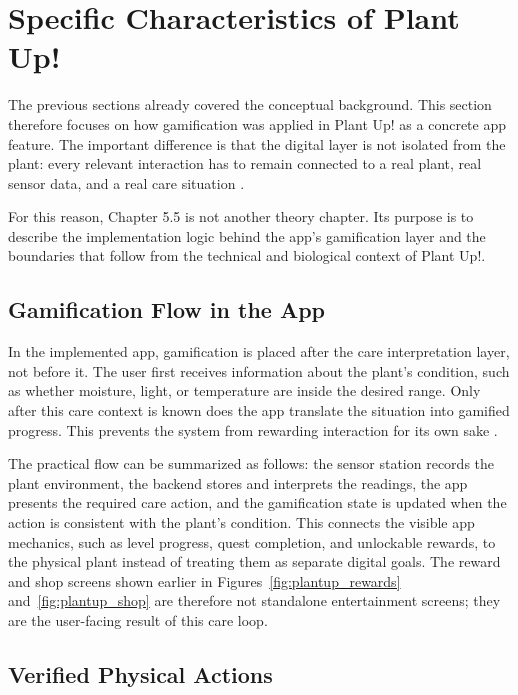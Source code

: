 \section{Specific Characteristics of Plant Up!}

The previous sections already covered the conceptual background. This section therefore focuses on how gamification was applied in Plant Up! as a concrete app feature. The important difference is that the digital layer is not isolated from the plant: every relevant interaction has to remain connected to a real plant, real sensor data, and a real care situation \cite{plantUpProject}.

For this reason, Chapter 5.5 is not another theory chapter. Its purpose is to describe the implementation logic behind the app's gamification layer and the boundaries that follow from the technical and biological context of Plant Up!.

\subsection{Gamification Flow in the App}

In the implemented app, gamification is placed after the care interpretation layer, not before it. The user first receives information about the plant's condition, such as whether moisture, light, or temperature are inside the desired range. Only after this care context is known does the app translate the situation into gamified progress. This prevents the system from rewarding interaction for its own sake \cite{plantUpProject,spinifyGamification}.

The practical flow can be summarized as follows: the sensor station records the plant environment, the backend stores and interprets the readings, the app presents the required care action, and the gamification state is updated when the action is consistent with the plant's condition. This connects the visible app mechanics, such as level progress, quest completion, and unlockable rewards, to the physical plant instead of treating them as separate digital goals. The reward and shop screens shown earlier in Figures~\ref{fig:plantup_rewards} and~\ref{fig:plantup_shop} are therefore not standalone entertainment screens; they are the user-facing result of this care loop.

\subsection{Verified Physical Actions}

